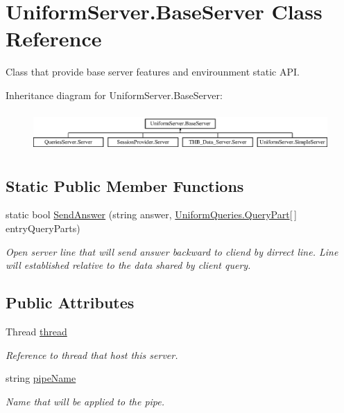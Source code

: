 \hypertarget{class_uniform_server_1_1_base_server}{}\section{Uniform\+Server.\+Base\+Server Class Reference}
\label{class_uniform_server_1_1_base_server}


Class that provide base server features and envirounment static A\+PI.  


Inheritance diagram for Uniform\+Server.\+Base\+Server\+:\begin{figure}[H]
\begin{center}
\leavevmode
\includegraphics[height=1.538461cm]{d7/d32/class_uniform_server_1_1_base_server}
\end{center}
\end{figure}
\subsection*{Static Public Member Functions}
\begin{DoxyCompactItemize}
\item 
static bool \mbox{\hyperlink{class_uniform_server_1_1_base_server_aa85e82df10ecec8324e2ccf7611d8cbf}{Send\+Answer}} (string answer, \mbox{\hyperlink{struct_uniform_queries_1_1_query_part}{Uniform\+Queries.\+Query\+Part}}\mbox{[}$\,$\mbox{]} entry\+Query\+Parts)
\begin{DoxyCompactList}\small\item\em Open server line that will send answer backward to cliend by dirrect line. Line will established relative to the data shared by client query. \end{DoxyCompactList}\end{DoxyCompactItemize}
\subsection*{Public Attributes}
\begin{DoxyCompactItemize}
\item 
Thread \mbox{\hyperlink{class_uniform_server_1_1_base_server_a52485a2d70e615a5cbf720c952a8d62f}{thread}}
\begin{DoxyCompactList}\small\item\em Reference to thread that host this server. \end{DoxyCompactList}\item 
string \mbox{\hyperlink{class_uniform_server_1_1_base_server_aaa318b3ed503dd8ccf381c9f3a81ecf2}{pipe\+Name}}
\begin{DoxyCompactList}\small\item\em Name that will be applied to the pipe. \end{DoxyCompactList}\end{DoxyCompactItemize}
